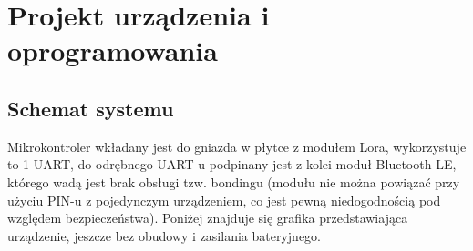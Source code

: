 \chapter{Projekt urządzenia i oprogramowania}
\section{Schemat systemu}
Mikrokontroler wkładany jest do gniazda w płytce z modułem Lora, wykorzystuje to 1 UART, do odrębnego UART-u podpinany jest z kolei moduł Bluetooth LE, którego wadą jest brak obsługi tzw. bondingu (modułu nie można powiązać przy użyciu PIN-u z pojedynczym urządzeniem, co jest pewną niedogodnością pod względem bezpieczeństwa).
Poniżej znajduje się grafika przedstawiająca urządzenie, jeszcze bez obudowy i zasilania bateryjnego.
